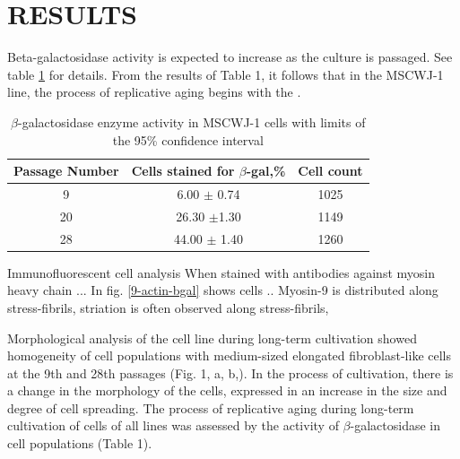 \documentclass[english,authoryear]{elsarticle}
\begin{document}
\section{RESULTS}

Beta-galactosidase activity is expected to increase as the culture is passaged. See table \ref{tab} for details. From the results of Table 1, it follows that in the MSCWJ-1 line, the process of replicative aging begins with the .

\begin{table}[hb]
  \caption{$\beta$-galactosidase enzyme activity in MSCWJ-1 cells with limits of the 95\% confidence interval}
  \label{tab}
\centering
\begin{tabular}{c|c|c}
 Passage Number & Cells stained for $\beta$-gal,\% & Cell count  \\
 \hline
 9 & 6.00 $\pm$ 0.74 & 1025 \\
 20 & 26.30 $\pm$1.30 & 1149  \\
 28 & 44.00 $\pm$ 1.40 & 1260

\end{tabular}
\end{table}


Immunofluorescent cell analysis
When stained with antibodies against myosin heavy chain ...
In fig. \ref{9-actin-bgal} shows cells ..
Myosin-9 is distributed along stress-fibrils, striation is often observed along stress-fibrils,


Morphological analysis of the cell line during long-term cultivation showed homogeneity of cell populations with medium-sized elongated fibroblast-like cells at the 9th and 28th passages (Fig. 1, a, b,). In the process of cultivation, there is a change in the morphology of the cells, expressed in an increase in the size and degree of cell spreading.
The process of replicative aging during long-term cultivation of cells of all lines was assessed by the activity of $\beta$-galactosidase in cell populations (Table 1).
\end{document}
